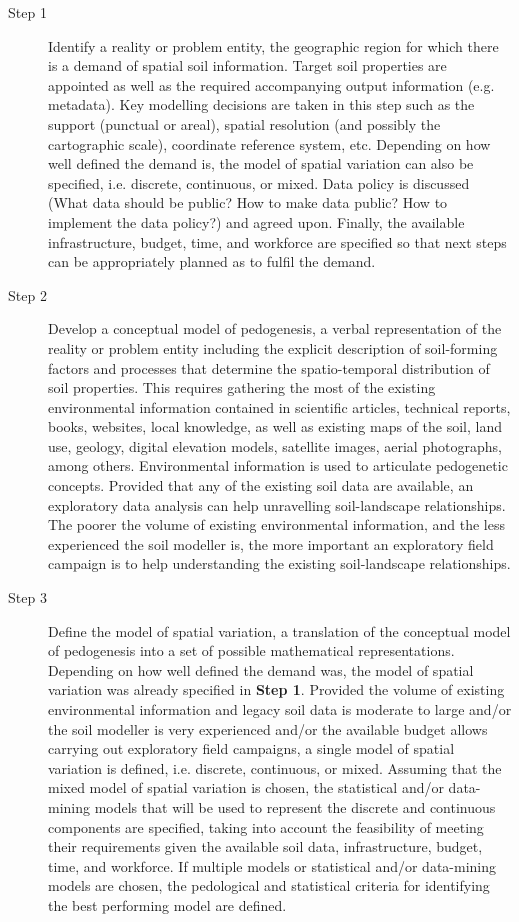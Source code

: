 \begin{description}
\item[Step 1] Identify a reality or problem entity, the geographic region for which
there is a demand of spatial soil information. Target soil properties are appointed as well as the
required accompanying output information (e.g. metadata). Key modelling decisions are taken in this step
such as the support (punctual or areal), spatial resolution (and possibly the cartographic scale),
coordinate reference system, etc. Depending on how well defined the demand is, the model of spatial
variation can also be specified, i.e. discrete, continuous, or mixed. Data policy is discussed (What data
should be public? How to make data public? How to implement the data policy?) and agreed upon. Finally,
the available infrastructure, budget, time, and workforce are specified so that next steps can be
appropriately planned as to fulfil the demand.

\item[Step 2] Develop a conceptual model of pedogenesis, a verbal representation of the
reality or problem entity including the explicit description of soil-forming factors and processes
that determine the spatio-temporal distribution of soil properties. This requires gathering the most
of the existing environmental information contained in scientific articles, technical reports,
books, websites, local knowledge, as well as existing maps of the soil, land use, geology, digital
elevation models, satellite images, aerial photographs, among others. Environmental information is used
to articulate pedogenetic concepts. Provided that any of the existing soil data are available, an
exploratory data analysis can help unravelling soil-landscape relationships. The poorer the volume of
existing environmental information, and the less experienced the soil modeller is, the more
important an exploratory field campaign is to help understanding the existing soil-landscape relationships.

\item[Step 3] Define the model of spatial variation, a translation of the conceptual
model of pedogenesis into a set of possible mathematical representations. Depending on
how well defined the demand was, the model of spatial variation was already specified in
\textbf{Step 1}. Provided the volume of existing environmental information and legacy soil data is
moderate to large and/or the soil modeller is very experienced and/or the available budget
allows carrying out exploratory field campaigns, a single model of spatial variation is
defined, i.e. discrete, continuous, or mixed. Assuming that the mixed model of spatial variation is
chosen, the statistical and/or data-mining models that will be used to represent the discrete
and continuous components are specified, taking into account the feasibility of meeting their
requirements given the available soil data, infrastructure, budget, time, and workforce. If multiple
models or statistical and/or data-mining models are chosen, the pedological and
statistical criteria for identifying the best performing model are defined.


\end{description}
